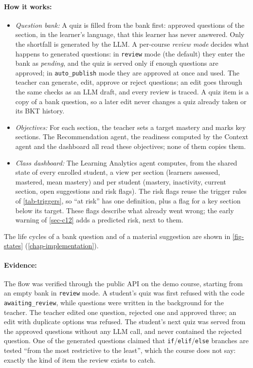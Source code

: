 \paragraph{How it works:}
\begin{itemize}
  \item \emph{Question bank:} A quiz is filled from the bank first:
        approved questions of the section, in the learner's language, that
        this learner has never answered. Only the shortfall is generated
        by the LLM. A per-course \emph{review mode} decides what happens to
        generated questions: in \texttt{review} mode (the default) they
        enter the bank as \emph{pending}, and the quiz is served only if
        enough questions are approved; in \texttt{auto\_publish} mode they
        are approved at once and used. The teacher can generate, edit,
        approve or reject questions; an edit goes through the same checks
        as an LLM draft, and every review is traced. A quiz item is a copy
        of a bank question, so a later edit never changes a quiz already
        taken or its BKT history.
  \item \emph{Objectives:} For each section, the teacher sets a target
        mastery and marks key sections. The Recommendation agent, the
        readiness computed by the Context agent and the dashboard all read
        these objectives; none of them copies them.
  \item \emph{Class dashboard:} The Learning Analytics agent computes, from
        the shared state of every enrolled student, a view per section
        (learners assessed, mastered, mean mastery) and per student
        (mastery, inactivity, current section, open suggestions and risk
        flags). The risk flags reuse the trigger rules of
        \cref{tab-triggers}, so ``at risk'' has one definition, plus a flag
        for a key section below its target. These flags describe what
        already went wrong; the early warning of \cref{sec-c12} adds a
        predicted risk, next to them.
\end{itemize}
The life cycles of a bank question and of a material suggestion are shown
in \cref{fig-states} (\cref{chap-implementation}).

\paragraph{Evidence:} The flow was verified through the public API on the
demo course, starting from an empty bank in \texttt{review} mode. A
student's quiz was first refused with the code \texttt{awaiting\_review},
while questions were written in the background for the teacher. The
teacher edited one question, rejected one and approved three; an edit
with duplicate options was refused. The student's next quiz was served
from the approved questions without any LLM call, and never contained the
rejected question. One of the generated questions claimed that
\texttt{if}/\texttt{elif}/\texttt{else} branches are tested ``from the
most restrictive to the least'', which the course does not say: exactly
the kind of item the review exists to catch.

